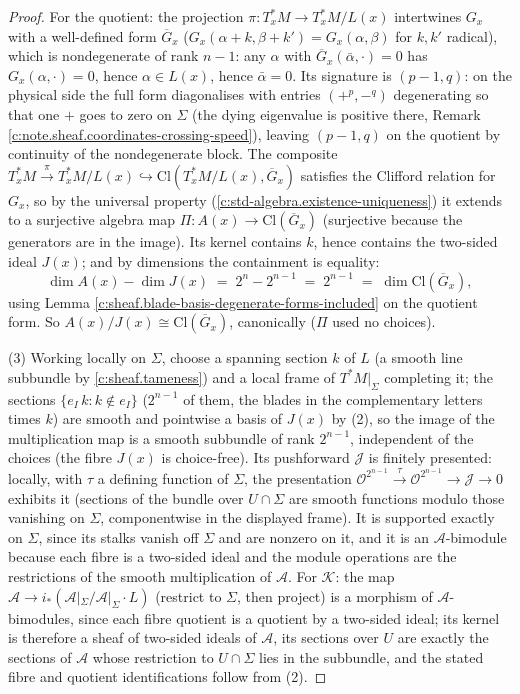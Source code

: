 \documentclass[11pt]{article}
\theoremstyle{definition}
\theoremstyle{plain}
\providecommand{\Cl}{}\renewcommand{\Cl}{\mathrm{Cl}}
\providecommand{\Sig}{}\renewcommand{\Sig}{\Sigma}
\providecommand{\shA}{}\renewcommand{\shA}{\mathcal{A}}
\providecommand{\shJ}{}\renewcommand{\shJ}{\mathcal{J}}
\providecommand{\shK}{}\renewcommand{\shK}{\mathcal{K}}
\providecommand{\shL}{}\renewcommand{\shL}{L}
\begin{document}
\begin{proof}
For the quotient: the projection $\pi : T^*_xM \to T^*_xM/\shL(x)$ intertwines $G_x$ with a well-defined form $\overline{G}_x$ ($G_x(\alpha + k, \beta + k') = G_x(\alpha, \beta)$ for $k, k'$ radical), which is nondegenerate of rank $n - 1$: any $\alpha$ with $\overline{G}_x(\bar\alpha, \cdot) = 0$ has $G_x(\alpha, \cdot) = 0$, hence $\alpha \in \shL(x)$, hence $\bar\alpha = 0$. Its signature is $(p{-}1, q)$: on the physical side the full form diagonalises with entries $(+^{p}, -^{q})$ degenerating so that one $+$ goes to zero on $\Sig$ (the dying eigenvalue is positive there, Remark \ref{c:note.sheaf.coordinates-crossing-speed}), leaving $(p{-}1, q)$ on the quotient by continuity of the nondegenerate block. The composite $T^*_xM \xrightarrow{\pi} T^*_xM/\shL(x) \hookrightarrow \Cl(T^*_xM/\shL(x), \overline{G}_x)$ satisfies the Clifford relation for $G_x$, so by the universal property (\ref{c:std-algebra.existence-uniqueness}) it extends to a surjective algebra map $\Pi : A(x) \to \Cl(\overline{G}_x)$ (surjective because the generators are in the image). Its kernel contains $k$, hence contains the two-sided ideal $J(x)$; and by dimensions the containment is equality:
\[
\dim A(x) - \dim J(x) \;=\; 2^n - 2^{n-1} \;=\; 2^{n-1} \;=\; \dim \Cl(\overline{G}_x),
\]
using Lemma \ref{c:sheaf.blade-basis-degenerate-forms-included} on the quotient form. So $A(x)/J(x) \cong \Cl(\overline{G}_x)$, canonically ($\Pi$ used no choices).

(3) Working locally on $\Sig$, choose a spanning section $k$ of $\shL$ (a smooth line subbundle by \ref{c:sheaf.tameness}) and a local frame of $T^*M|_\Sig$ completing it; the sections $\{e_I\, k : k \notin e_I\}$ ($2^{n-1}$ of them, the blades in the complementary letters times $k$) are smooth and pointwise a basis of $J(x)$ by (2), so the image of the multiplication map is a smooth subbundle of rank $2^{n-1}$, independent of the choices (the fibre $J(x)$ is choice-free). Its pushforward $\shJ$ is finitely presented: locally, with $\tau$ a defining function of $\Sig$, the presentation $\mathcal{O}^{2^{n-1}} \xrightarrow{\ \tau\ } \mathcal{O}^{2^{n-1}} \to \shJ \to 0$ exhibits it (sections of the bundle over $U \cap \Sig$ are smooth functions modulo those vanishing on $\Sig$, componentwise in the displayed frame). It is supported exactly on $\Sig$, since its stalks vanish off $\Sig$ and are nonzero on it, and it is an $\shA$-bimodule because each fibre is a two-sided ideal and the module operations are the restrictions of the smooth multiplication of $\shA$. For $\shK$: the map $\shA \to i_*(\shA|_\Sig / \shA|_\Sig \cdot \shL)$ (restrict to $\Sig$, then project) is a morphism of $\shA$-bimodules, since each fibre quotient is a quotient by a two-sided ideal; its kernel is therefore a sheaf of two-sided ideals of $\shA$, its sections over $U$ are exactly the sections of $\shA$ whose restriction to $U \cap \Sig$ lies in the subbundle, and the stated fibre and quotient identifications follow from (2).

\end{proof}
\end{document}
